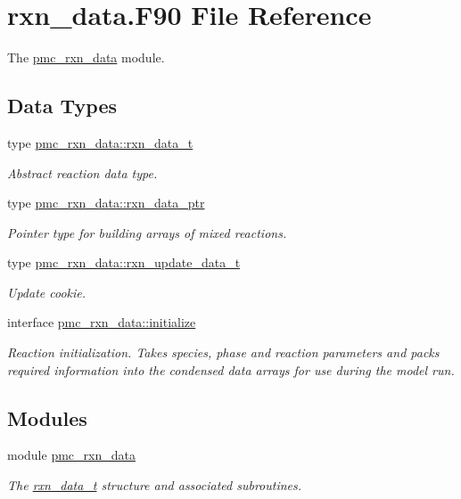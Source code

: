 \hypertarget{rxn__data_8_f90}{}\section{rxn\+\_\+data.\+F90 File Reference}
\label{rxn__data_8_f90}


The \mbox{\hyperlink{namespacepmc__rxn__data}{pmc\+\_\+rxn\+\_\+data}} module.  


\subsection*{Data Types}
\begin{DoxyCompactItemize}
\item 
type \mbox{\hyperlink{structpmc__rxn__data_1_1rxn__data__t}{pmc\+\_\+rxn\+\_\+data\+::rxn\+\_\+data\+\_\+t}}
\begin{DoxyCompactList}\small\item\em Abstract reaction data type. \end{DoxyCompactList}\item 
type \mbox{\hyperlink{structpmc__rxn__data_1_1rxn__data__ptr}{pmc\+\_\+rxn\+\_\+data\+::rxn\+\_\+data\+\_\+ptr}}
\begin{DoxyCompactList}\small\item\em Pointer type for building arrays of mixed reactions. \end{DoxyCompactList}\item 
type \mbox{\hyperlink{structpmc__rxn__data_1_1rxn__update__data__t}{pmc\+\_\+rxn\+\_\+data\+::rxn\+\_\+update\+\_\+data\+\_\+t}}
\begin{DoxyCompactList}\small\item\em Update cookie. \end{DoxyCompactList}\item 
interface \mbox{\hyperlink{interfacepmc__rxn__data_1_1initialize}{pmc\+\_\+rxn\+\_\+data\+::initialize}}
\begin{DoxyCompactList}\small\item\em Reaction initialization. Takes species, phase and reaction parameters and packs required information into the condensed data arrays for use during the model run. \end{DoxyCompactList}\end{DoxyCompactItemize}
\subsection*{Modules}
\begin{DoxyCompactItemize}
\item 
module \mbox{\hyperlink{namespacepmc__rxn__data}{pmc\+\_\+rxn\+\_\+data}}
\begin{DoxyCompactList}\small\item\em The \mbox{\hyperlink{structpmc__rxn__data_1_1rxn__data__t}{rxn\+\_\+data\+\_\+t}} structure and associated subroutines. \end{DoxyCompactList}\end{DoxyCompactItemize}
